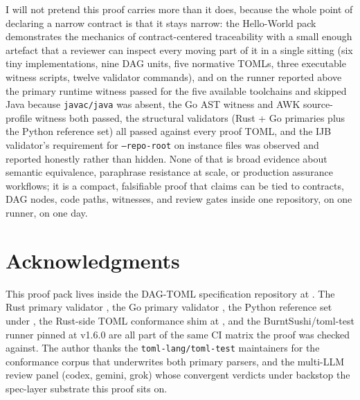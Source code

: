 \documentclass[11pt,letterpaper]{article}
\newcommand{\dagtoml}{DAG-TOML}
\begin{document}
I will not pretend this proof carries more than it does, because the
whole point of declaring a narrow contract is that it stays narrow:
the Hello-World pack demonstrates the mechanics of contract-centered
traceability with a small enough artefact that a reviewer can inspect
every moving part of it in a single sitting (six tiny implementations,
nine DAG units, five normative TOMLs, three executable witness scripts,
twelve validator commands), and on the runner reported above the
primary runtime witness passed for the five available toolchains and
skipped Java because \texttt{javac/java} was absent, the Go AST witness
and AWK source-profile witness both passed, the structural validators
(Rust + Go primaries plus the Python reference set) all passed against
every proof TOML, and the IJB validator's requirement for
\texttt{--repo-root} on instance files was observed and reported
honestly rather than hidden. None of that is broad evidence about
semantic equivalence, paraphrase resistance at scale, or production
assurance workflows; it is a compact, falsifiable proof that claims
can be tied to contracts, DAG nodes, code paths, witnesses, and
review gates inside one repository, on one runner, on one day.

\section*{Acknowledgments}

This proof pack lives inside the \dagtoml{} specification repository
at . The Rust primary validator
, the Go primary validator
, the Python reference set under
, the Rust-side TOML conformance shim at
, and the BurntSushi/toml-test
runner pinned at v1.6.0 are all part of the same CI matrix the
proof was checked against. The author thanks the
\texttt{toml-lang/toml-test} maintainers for the conformance corpus
that underwrites both primary parsers, and the multi-LLM review
panel (codex, gemini, grok) whose convergent verdicts under
 backstop the spec-layer
substrate this proof sits on.



\end{document}

